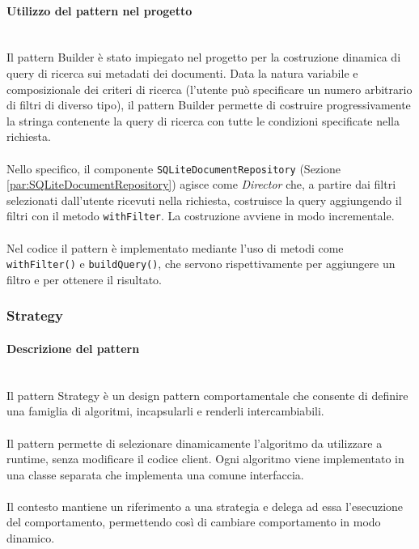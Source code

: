 \documentclass[a4paper,12pt]{article}
\begin{document}
{{{                \paragraph{Utilizzo del pattern nel progetto}\mbox{}\\
                Il pattern Builder è stato impiegato nel progetto per la costruzione dinamica di query di ricerca sui metadati dei documenti. Data la natura variabile e composizionale dei criteri di ricerca (l'utente può specificare un numero arbitrario di filtri di diverso tipo), il pattern Builder permette di costruire progressivamente la stringa contenente la query di ricerca con tutte le condizioni specificate nella richiesta.\\
                \\
                Nello specifico, il componente \texttt{SQLiteDocumentRepository} (Sezione \ref{par:SQLiteDocumentRepository}) agisce come \textit{Director} che, a partire dai filtri selezionati dall'utente ricevuti nella richiesta, costruisce la query aggiungendo il filtri con il metodo \texttt{withFilter}. La costruzione avviene in modo incrementale.\\
                \\
                Nel codice il pattern è implementato mediante l'uso di metodi come \texttt{withFilter()} e \texttt{buildQuery()}, che servono rispettivamente per aggiungere un filtro e per ottenere il risultato.
            }
            \subsubsection{Strategy} {
                \paragraph{Descrizione del pattern}\mbox{}\\
                Il pattern Strategy è un design pattern comportamentale che consente di definire una famiglia di algoritmi, incapsularli e renderli intercambiabili.\\
                \\
                Il pattern permette di selezionare dinamicamente l’algoritmo da utilizzare a runtime, senza modificare il codice client. Ogni algoritmo viene implementato in una classe separata che implementa una comune interfaccia.\\
                \\
                Il contesto mantiene un riferimento a una strategia e delega ad essa l’esecuzione del comportamento, permettendo così di cambiare comportamento in modo dinamico.
                
}}}
\end{document}
